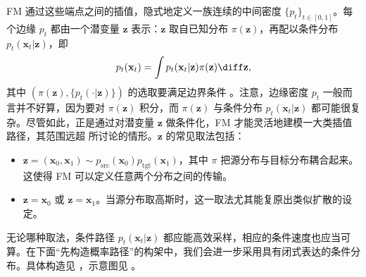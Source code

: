 FM 通过这些端点之间的插值，隐式地定义一族连续的中间密度 $\{ p_t \}_{t \in [0,1]}$。每个边缘 $ p_t $ 都由一个潜变量 $\mathbf{z}$ 表示：$\mathbf{z}$ 取自已知分布 $\pi(\mathbf{z})$，再配以条件分布 $p_t(\mathbf{x}_t | \mathbf{z})$，即
\begin{equation}\label{eq:p_t}
    p_t(\mathbf{x}_t) = \int p_t(\mathbf{x}_t | \mathbf{z}) \pi(\mathbf{z}) \diff \mathbf{z},
\end{equation}
其中 $(\pi(\mathbf{z}), \{p_t(\cdot|\mathbf{z})\})$ 的选取要满足边界条件 。注意，边缘密度 $p_t$ 一般而言并不好算，因为要对 $\pi(\mathbf{z})$ 积分，而 $\pi(\mathbf{z})$ 与条件分布 $p_t(\mathbf{x}_t|\mathbf{z})$ 都可能很复杂。尽管如此，正是通过对潜变量 $\mathbf{z}$ 做条件化，FM 才能灵活地建模一大类插值路径，其范围远超  所讨论的情形。$\mathbf{z}$ 的常见取法包括：
\begin{itemize}
    \item {} $\mathbf{z} = (\mathbf{x}_0, \mathbf{x}_1) \sim p_{\text{src}}(\mathbf{x}_0) p_{\text{tgt}}(\mathbf{x}_1)$，其中 $\pi$ 把源分布与目标分布耦合起来。这使得 FM 可以定义任意两个分布之间的传输。
    \item {} $\mathbf{z} = \mathbf{x}_0$ 或 $\mathbf{z} = \mathbf{x}_1$。当源分布取高斯时，这一取法尤其能复原出类似扩散的设定。
\end{itemize}

无论哪种取法，条件路径 $p_t(\mathbf{x}_t|\mathbf{z})$ 都应能高效采样，相应的条件速度也应当可算。在下面“先构造概率路径”的构架中，我们会进一步采用具有闭式表达的条件分布。具体构造见 ，示意图见 。

